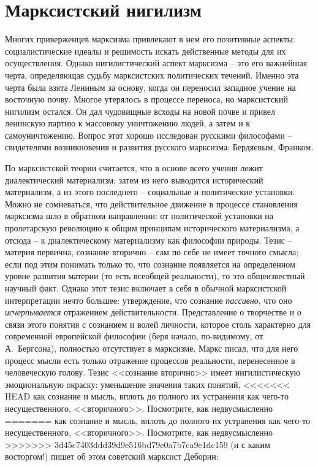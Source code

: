 \documentclass{book}
\begin{document}
\section{Марксистский нигилизм}


Многих приверженцев марксизма привлекают в нем его пози­тивные аспекты: социалистические идеалы и решимость искать действенные 
методы для их осуществления. Однако нигилисти­ческий аспект марксизма -- это его важнейшая черта, определя­ющая судьбу 
марксистских политических течений. Именно эта черта была взята Лениным за основу, когда он переносил западное учение на 
восточную почву. Многое утерялось в процессе переноса, но марксистский нигилизм остался. Он дал чудовищные всходы на новой почве 
и привел ленинскую партию к массовому уничтожению людей, а затем и к самоуничтожению. Вопрос этот хорошо исследован русскими 
философами -- свидетелями воз­никновения и развития русского марксизма: Бердяевым, Фран­ком.

По марксистской теории считается, что в основе всего учения лежит диалектический материализм; затем из него выводится 
исторический материализм, а из этого последнего -- социальные и политические установки. Можно не сомневаться, что действительное 
движение в процессе становления марксизма шло в обратном направлении: от политической установки на пролетарскую революцию к 
общим принципам исторического материа­лизма, а отсюда -- к диалектическому материализму как фило­софии природы. Тезис -- материя 
первична, сознание вторично -- сам по себе не имеет точного смысла; если под этим понимать только то, что сознание появляется на 
определенном уровне развития материи (то есть всеобщей реальности), то это общеизвестный научный факт. Однако этот тезис 
включает в себя в обычной марксистской интерпретации нечто большее: утверждение, что сознание \textit{пассивно},  что оно 
\textit{исчерпывается} отражением действительности. Представление о творчестве и о связи этого понятия с сознанием и волей 
личности, которое столь характерно для современной европейской философии (беря начало, по-видимому, от А.~Бергсона), полностью 
отсутствует в марксизме. Маркс писал, что для него процесс мысли есть только отражение процессов реальности, перенесенное в 
человеческую голову. Тезис <<сознание вторично>> имеет нигилистическую эмоциональную окраску: уменьшение значения таких понятий, 
<<<<<<< HEAD
как сознание и мысль, вплоть до полного их устранения как чего‑то несущественного, <<вторичного>>. Посмотрите, как недвусмысленно 
=======
как сознание и мысль, вплоть до полного их устранения как чего-то несущественного, <<вторичного>>. Посмотрите, как недвусмысленно 
>>>>>>> 3d45c7403ddd39d9e516bd79e0a7b7ca9e1dc159
(и с каким восторгом!) пишет об этом советский марксист Деборин:
\end{document}
